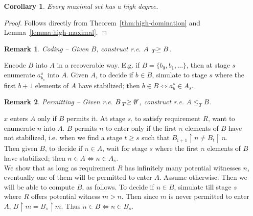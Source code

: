 \documentclass{article}
\newtheorem{remark}{Remark}[subsection]
\newtheorem{corollary}{Corollary}[subsection]
\begin{document}
  \begin{corollary}
    Every maximal set has a high degree.
  \end{corollary}
  \begin{proof}
    Follows directly from Theorem~\ref{thm:high-domination} and
    Lemma~\ref{lemma:high-maximal}.
  \end{proof}

  \begin{remark}
    Coding -- Given $B$, construct r.e. $A\; \prescript{}{T}{\geq}\; B$.
  \end{remark}
  Encode $B$ into $A$ in a recoverable way. E.g. if $B=\{b_0,b_1,\ldots\}$,
  then at stage $s$ enumerate $a_{b_s}^s$ into $A$. Given $A$, to decide if
  $b\in B$, simulate to stage $s$ where the first $b+1$ elements of $A$
  have stabilized; then $b\in B \Leftrightarrow a_{b}^s\in A_s$.

  \begin{remark}
    Permitting -- Given r.e. $B \prescript{}{T}{\geq}\; \emptyset'$,
    construct r.e. $A\leq_T B$.
  \end{remark}
  $x$ enters $A$ only if $B$ permits it. At stage $s$, to satisfy
  requirement $R$, want to enumerate $n$ into $A$. $B$ permits $n$ to
  enter only if the first $n$ elements of $B$ have not stabilized, i.e.
  when we find a stage $t\geq s$ such that $B_{t+1}\restriction n \neq
  B_t\restriction n$. \\

  Then given $B$, to decide if $n\in A$, wait for stage $s$ where the first
  $n$ elements of $B$ have stabilized; then $n\in A \Leftrightarrow n\in
  A_s$. \\

  We show that as long as requirement $R$ has infinitely many potential
  witnesses $n$, eventually one of them will be permitted to enter $A$.
  Assume otherwise. Then we will be able to compute $B$, as follows. To
  decide if $n\in B$, simulate till stage $s$ where $R$ offers potential
  witness $m>n$. Then since $m$ is never permitted to enter $A$,
  $B\restriction m=B_s\restriction m$. Thus $n\in B \Leftrightarrow n\in
  B_s$.
\end{document}
